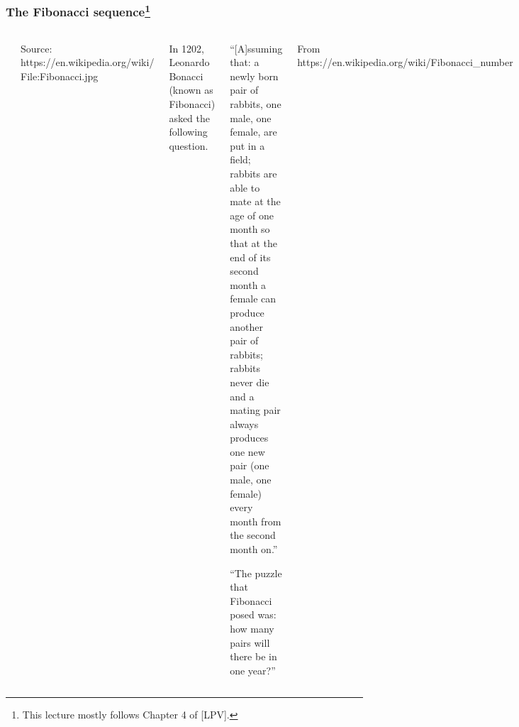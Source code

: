 

\begin{frame}\frametitle{The Fibonacci sequence\footnote{This lecture mostly follows Chapter 4 of [LPV].}}

  \begin{columns}[c]
    \includegraphics{images/fibonacci.jpg}

    {\tiny Source: https://en.wikipedia.org/wiki/ File:Fibonacci.jpg}
    
    In 1202, Leonardo Bonacci (known as Fibonacci) asked the following
    question.

    \begin{tcolorbox}
      {\footnotesize ``[A]ssuming that: a newly born pair of rabbits,
        one male, one female, are put in a field; rabbits are able to
        mate at the age of one month so that at the end of its second
        month a female can produce another pair of rabbits; rabbits
        never die and a mating pair always produces one new pair (one
        male, one female) every month from the second month on.''

        ``The puzzle that Fibonacci posed was: how many pairs will
        there be in one year?''}
    \end{tcolorbox}
    
    {\tiny From https://en.wikipedia.org/wiki/Fibonacci\_number}
  \end{columns}
\end{frame}

